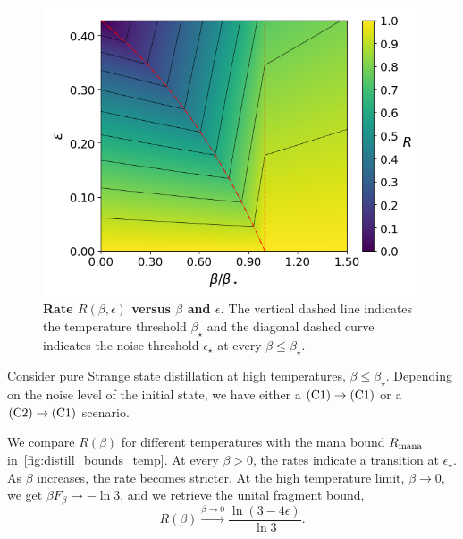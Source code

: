 \documentclass[pra,
aps,
twocolumn,
superscriptaddress,
groupedaddress,
nofootinbib,
reprint
]{revtex4-1}
\begin{document}
\begin{figure}[h]
    \centering
    \includegraphics[scale=0.5]{figs/rate_contour.png}
    \caption{\textbf{Rate $R(\beta, \epsilon)$ versus $\beta$ and $\epsilon$.}
    The vertical dashed line indicates the temperature threshold $\beta_\star$ and the diagonal dashed curve indicates the noise threshold $\epsilon_\star$ at every $\beta \leq \beta_\star$.
    }
    \label{fig:rate_contour}
\end{figure}

Consider pure Strange state distillation at high temperatures, $\beta \leq \beta_{\star}$.
Depending on the noise level of the initial state, we have either a $\rm{(C1)} \rightarrow \rm{(C1)}$ or a $\rm{(C2)} \rightarrow \rm{(C1)}$ scenario.

We compare $R(\beta)$ for different temperatures with the mana bound $R_{\rm{mana}}$ in~\cref{fig:distill_bounds_temp}.
At every $\beta > 0$, the rates indicate a transition at $\epsilon_{\star}$.
As $\beta$ increases, the rate becomes stricter.
At the high temperature limit, $\beta \rightarrow 0$, we get $\beta F_\beta \rightarrow -\ln{3}$, and we retrieve the unital fragment bound,
\begin{equation}
	R(\beta) \xrightarrow{\beta \rightarrow 0} \frac{\ln{(3-4\epsilon)}}{\ln{3}}.
\end{equation}
\end{document}
